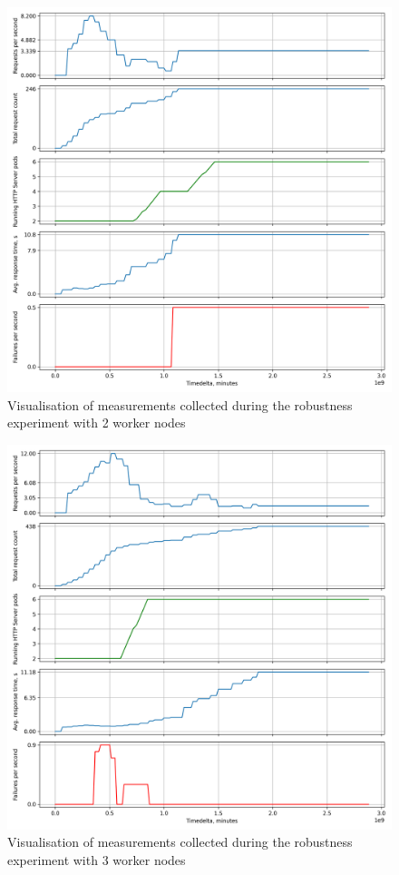 \documentclass[12pt]{article}
\begin{document}
\begin{figure}[p]
    \centering
    \includegraphics[width=\textwidth]{figures/robustness_2_nodes.png}
    \caption{Visualisation of measurements collected during the robustness experiment with 2 worker nodes}
    \label{fig:robustness_2_nodes}
\end{figure}

\begin{figure}[p]
    \centering
    \includegraphics[width=\textwidth]{figures/robustness_3_nodes.png}
    \caption{Visualisation of measurements collected during the robustness experiment with 3 worker nodes}
    \label{fig:robustness_3_nodes}
\end{figure}
\end{document}
